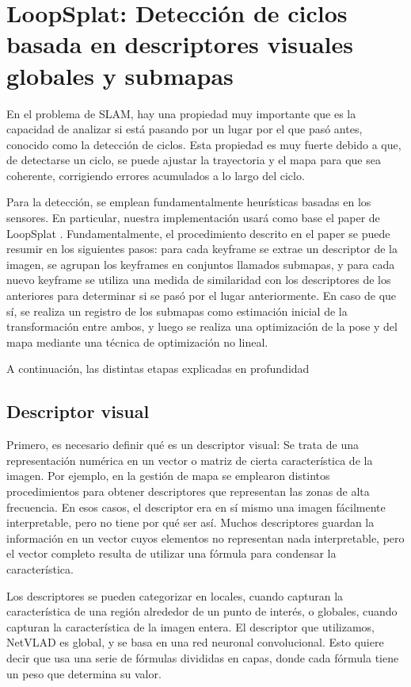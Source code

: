 \section{LoopSplat: Detección de ciclos basada en descriptores visuales globales y submapas}

En el problema de SLAM, hay una propiedad muy importante que es la capacidad de analizar si está pasando por un lugar por el que pasó antes, conocido como la detección de ciclos. Esta propiedad es muy fuerte debido a que, de detectarse un ciclo, se puede ajustar la trayectoria y el mapa para que sea coherente, corrigiendo errores acumulados a lo largo del ciclo.

Para la detección, se emplean fundamentalmente heurísticas basadas en los sensores. En particular, nuestra implementación usará como base el paper de LoopSplat \cite{zhu2025_loopsplat}. Fundamentalmente, el procedimiento descrito en el paper se puede resumir en los siguientes pasos: para cada keyframe se extrae un descriptor de la imagen, se agrupan los keyframes en conjuntos llamados submapas, y para cada nuevo keyframe se utiliza una medida de similaridad con los descriptores de los anteriores para determinar si se pasó por el lugar anteriormente. En caso de que sí, se realiza un registro de los submapas como estimación inicial de la transformación entre ambos, y luego se realiza una optimización de la pose y del mapa mediante una técnica de optimización no lineal.

A continuación, las distintas etapas explicadas en profundidad


\subsection{Descriptor visual}

Primero, es necesario definir qué es un descriptor visual: Se trata de una representación numérica en un vector o matriz de cierta característica de la imagen. Por ejemplo, en la gestión de mapa se emplearon distintos procedimientos para obtener descriptores que representan las zonas de alta frecuencia. En esos casos, el descriptor era en sí mismo una imagen fácilmente interpretable, pero no tiene por qué ser así. Muchos descriptores guardan la información en un vector cuyos elementos no representan nada interpretable, pero el vector completo resulta de utilizar una fórmula para condensar la característica. 

Los descriptores se pueden categorizar en locales, cuando capturan la característica de una región alrededor de un punto de interés, o globales, cuando capturan la característica de la imagen entera. El descriptor que utilizamos, NetVLAD \cite{arandjelović2016netvladcnnarchitectureweakly} es global, y se basa en una red neuronal convolucional. Esto quiere decir que usa una serie de fórmulas divididas en capas, donde cada fórmula tiene un peso que determina su valor. 


